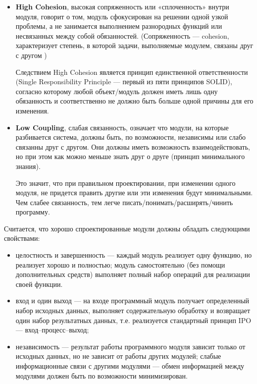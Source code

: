 \documentclass[a4paper]{article}
\begin{document}
\begin{itemize}
\item \textbf{High Cohesion}, высокая сопряженность или «сплоченность» внутри модуля, говорит о том, модуль сфокусирован на решении одной узкой проблемы, а не занимается выполнением разнородных функций или несвязанных между собой обязанностей. (Сопряженность — cohesion, характеризует степень, в которой задачи, выполняемые модулем, связаны друг с другом )

Следствием High Cohesion является принцип единственной ответственности (Single Responsibility Principle — первый из пяти принципов SOLID), согласно которому любой объект/модуль должен иметь лишь одну обязанность и соответственно не должно быть больше одной причины для его изменения.

\item \textbf{Low Coupling}, слабая связанность, означает что модули, на которые разбивается система, должны быть, по возможности, независимы или слабо связанны друг с другом. Они должны иметь возможность взаимодействовать, но при этом как можно меньше знать друг о друге (принцип минимального знания).

Это значит, что при правильном проектировании, при изменении одного модуля, не придется править другие или эти изменения будут минимальными. Чем слабее связанность, тем легче писать/понимать/расширять/чинить программу.
\end{itemize}

Считается, что хорошо спроектированные модули должны обладать следующими свойствами:
\begin{itemize}
    \item { целостность и завершенность} — каждый модуль реализует одну функцию, но реализует хорошо и полностью; модуль самостоятельно (без помощи дополнительных средств) выполняет полный набор операций для реализации своей функции.
    \item { вход и один выход} — на входе программный модуль получает определенный набор исходных данных, выполняет содержательную обработку и возвращает один набор результатных данных, т.е. реализуется стандартный принцип IPO — вход–процесс–выход;
    \item { независимость} — результат работы программного модуля зависит только от исходных данных, но не зависит от работы других модулей;
    слабые информационные связи с другими модулями — обмен информацией между модулями должен быть по возможности минимизирован.
\end{itemize}
\end{document}
